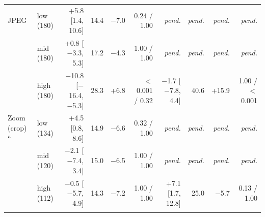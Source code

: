 \begin{table}[t]
\begin{tabular}{@{}llrrrrrrrr@{}}
\addlinespace[1pt]
JPEG & low (180) & +5.8 [1.4, 10.6] & 14.4 & $-$7.0 & 0.24 / 1.00 & \textit{pend.} & \textit{pend.} & \textit{pend.} & \textit{pend.} \\
 & mid (180) & +0.8 [$-$3.3, 5.3] & 17.2 & $-$4.3 & 1.00 / 1.00 & \textit{pend.} & \textit{pend.} & \textit{pend.} & \textit{pend.} \\
 & high (180) & $-$10.8 [$-$16.4, $-$5.3] & 28.3 & +6.8 & $<$0.001 / 0.32 & $-$1.7 [$-$7.8, 4.4] & 40.6 & +15.9 & 1.00 / $<$0.001 \\
\addlinespace[1pt]
Zoom (crop)$^{\rm a}$ & low (134) & +4.5 [0.8, 8.6] & 14.9 & $-$6.6 & 0.32 / 1.00 & \textit{pend.} & \textit{pend.} & \textit{pend.} & \textit{pend.} \\
 & mid (120) & $-$2.1 [$-$7.4, 3.4] & 15.0 & $-$6.5 & 1.00 / 1.00 & \textit{pend.} & \textit{pend.} & \textit{pend.} & \textit{pend.} \\
 & high (112) & $-$0.5 [$-$5.7, 4.9] & 14.3 & $-$7.2 & 1.00 / 1.00 & +7.1 [1.7, 12.8] & 25.0 & $-$5.7 & 0.13 / 1.00 \\
\addlinespace[1pt]
\bottomrule
\end{tabular}
\end{table}

